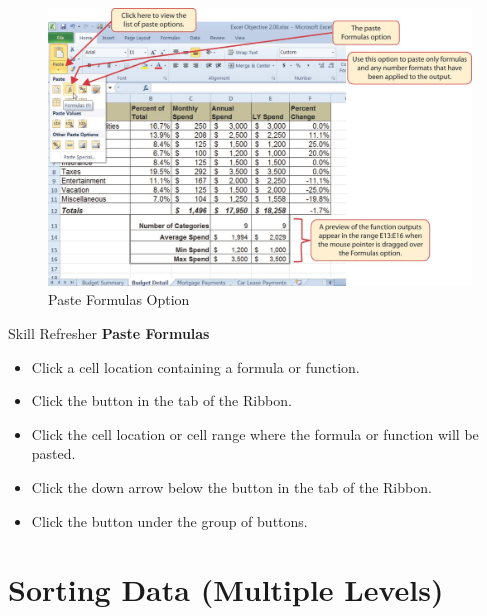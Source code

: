 \begin{figure}[H]
	\centering
	\includegraphics[width=\maxwidth{.95\linewidth}]{gfx/ch02_fig26}
	\caption{Paste Formulas Option}
	\label{02:fig26}
\end{figure}

\begin{center}
	\begin{sklbox}{Skill Refresher}
		\textbf{Paste Formulas}
		\\
		\begin{itemize}
			\setlength{\itemsep}{0pt}
			\setlength{\parskip}{0pt}
			\setlength{\parsep}{0pt}
			
			\item Click a cell location containing a formula or function.
			\item Click the  button in the  tab of the Ribbon.
			\item Click the cell location or cell range where the formula or function will be pasted.
			\item Click the down arrow below the  button in the  tab of the Ribbon.
			\item Click the  button under the  group of buttons.
			
		\end{itemize}
	\end{sklbox}
\end{center}

\section{Sorting Data (Multiple Levels)}

